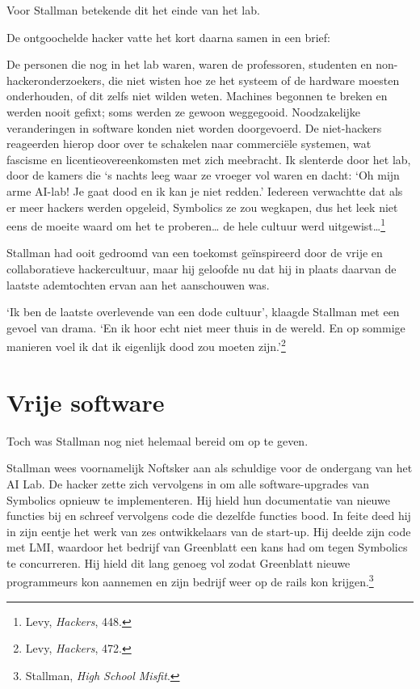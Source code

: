 \documentclass[
  a5paper,
  smalldemyvopaper,11pt,twoside,onecolumn,openright,extrafontsizes,
hidelinks]{memoir}
\renewenvironment{quote}%
               {\list{}{\rightmargin=.3cm\leftmargin=.3cm}%
                \itshape \item[]}%
               {\endlist}
\begin{document}
Voor Stallman betekende dit het einde van het lab.

De ontgoochelde hacker vatte het kort daarna samen in een brief:

\begin{quote}
De personen die nog in het lab waren, waren de professoren, studenten en
non-hackeronderzoekers, die niet wisten hoe ze het systeem of de
hardware moesten onderhouden, of dit zelfs niet wilden weten. Machines
begonnen te breken en werden nooit gefixt; soms werden ze gewoon
weggegooid. Noodzakelijke veranderingen in software konden niet worden
doorgevoerd. De niet-hackers reageerden hierop door over te schakelen
naar commerciële systemen, wat fascisme en licentieovereenkomsten met
zich meebracht. Ik slenterde door het lab, door de kamers die `s nachts
leeg waar ze vroeger vol waren en dacht: `Oh mijn arme AI-lab! Je gaat
dood en ik kan je niet redden.' Iedereen verwachtte dat als er meer
hackers werden opgeleid, Symbolics ze zou wegkapen, dus het leek niet
eens de moeite waard om het te proberen\ldots{} de hele cultuur werd
uitgewist\ldots{}\footnote{\hspace{0pt}Levy, \emph{Hackers}, 448.}
\end{quote}

Stallman had ooit gedroomd van een toekomst geïnspireerd door de vrije
en collaboratieve hackercultuur, maar hij geloofde nu dat hij in plaats
daarvan de laatste ademtochten ervan aan het aanschouwen was.

`Ik ben de laatste overlevende van een dode cultuur', klaagde Stallman
met een gevoel van drama. `En ik hoor echt niet meer thuis in de wereld.
En op sommige manieren voel ik dat ik eigenlijk dood zou moeten
zijn.'\footnote{\hspace{0pt}Levy, \emph{Hackers}, 472.}

\section{Vrije software}\label{vrije-software}

Toch was Stallman nog niet helemaal bereid om op te geven.

Stallman wees voornamelijk Noftsker aan als schuldige voor de ondergang
van het AI Lab. De hacker zette zich vervolgens in om alle
software-upgrades van Symbolics opnieuw te implementeren. Hij hield hun
documentatie van nieuwe functies bij en schreef vervolgens code die
dezelfde functies bood. In feite deed hij in zijn eentje het werk van
zes ontwikkelaars van de start-up. Hij deelde zijn code met LMI,
waardoor het bedrijf van Greenblatt een kans had om tegen Symbolics te
concurreren. Hij hield dit lang genoeg vol zodat Greenblatt nieuwe
programmeurs kon aannemen en zijn bedrijf weer op de rails kon
krijgen.\footnote{\hspace{0pt}Stallman, \emph{High School Misfit}.}
\end{document}
